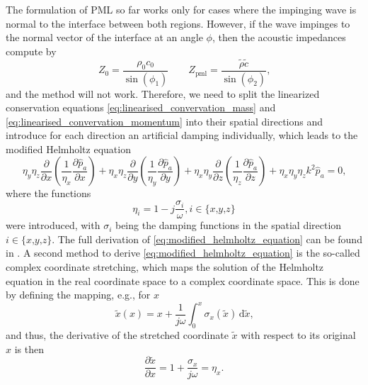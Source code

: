 The formulation of PML so far works only for cases where the impinging wave is normal to the interface between both regions. However, if the wave impinges to the normal vector of the interface at an angle $\phi$, then the acoustic impedances compute by
\begin{equation}
	Z_{\text{0}} = \frac{\rho_0 c_0}{\sin(\phi_1)}\qquad Z_{\text{pml}} = \frac{\tilde{\rho} \tilde{c}}{\sin(\phi_2)} \text{,}
\end{equation}
and the method will not work. Therefore, we need to split the linearized conservation equations \cref{eq:linearised_convervation_mass} and \cref{eq:linearised_convervation_momentum} into their spatial directions and introduce for each direction an artificial damping individually, which leads to the modified Helmholtz equation
\begin{equation}
	\eta_y\eta_z\frac{\partial}{\partial x}\left(\frac{1}{\eta_x}\frac{\partial\hat{p}_a}{\partial x}\right) + \eta_x\eta_z\frac{\partial}{\partial y}\left(\frac{1}{\eta_y}\frac{\partial\hat{p}_a}{\partial y}\right) + \eta_x\eta_y\frac{\partial}{\partial z}\left(\frac{1}{\eta_z}\frac{\partial\hat{p}_a}{\partial z}\right) + \eta_x\eta_y\eta_zk^2\hat{p}_a = 0 \text{,} \label{eq:modified_helmholtz_equation}
\end{equation}
where the functions
\begin{equation}
	\eta_i = 1 - j\frac{\sigma_i}{\omega}\text{,}\,i \in \lbrace x\text{,}y\text{,}z\rbrace
\end{equation}
were introduced, with $\sigma_i$ being the damping functions in the spatial direction $i\in\lbrace x\text{,}y\text{,}z\rbrace$. The full derivation of \cref{eq:modified_helmholtz_equation} can be found in \cite{kaltenbacher_numerical_2007}. A second method to derive \cref{eq:modified_helmholtz_equation} is the so-called complex coordinate stretching, which maps the solution of the Helmholtz equation in the real coordinate space to a complex coordinate space. This is done by defining the mapping, e.g., for $x$
\begin{equation}
	\tilde{x}(x) = x + \frac{1}{j\omega}\int_{0}^{x} \sigma_x(\tilde{x})\,\text{d}\tilde{x}\text{,}
\end{equation}
and thus, the derivative of the stretched coordinate $\tilde{x}$ with respect to its original $x$ is then
\begin{equation}
	\frac{\partial \tilde{x}}{\partial x} = 1 + \frac{\sigma_x}{j\omega} = \eta_x \text{.} \label{eq:derivative_stretched_coordinate}
\end{equation}
